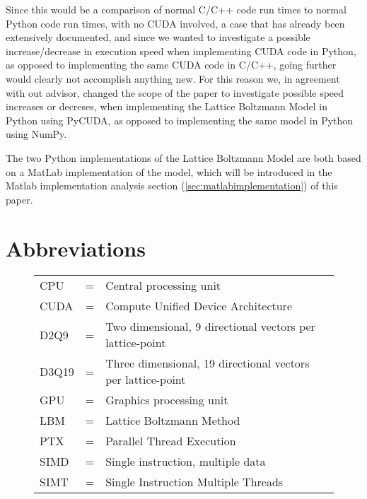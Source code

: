 Since this would be a comparison of normal C/C++ code run times to normal Python code run times, with no CUDA involved, a case that has already been extensively documented, and since we wanted to investigate a possible increase/decrease in execution speed when implementing CUDA code in Python, as opposed to implementing the same CUDA code in C/C++, going further would clearly not accomplish anything new. For this reason we, in agreement with out advisor, changed the scope of the paper to investigate possible speed increases or decreses, when implementing the Lattice Boltzmann Model in Python using PyCUDA, as opposed to implementing the same model in Python using NumPy.

The two Python implementations of the Lattice Boltzmann Model are both based on a MatLab implementation of the model, which will be introduced in the Matlab implementation analysis section (\autoref{sec:matlabimplementation}) of this paper.

\newpage

\section{Abbreviations}

\begin{figure}[htb]
\centering
	\begin{tabular}{lcl}
	    CPU & = & Central processing unit\\
	    CUDA & = & Compute Unified Device Architecture\\
		D2Q9 & = & Two dimensional, 9 directional vectors per lattice-point\\
		D3Q19 & = & Three dimensional, 19 directional vectors per lattice-point\\
		GPU & = & Graphics processing unit\\
		LBM & = & Lattice Boltzmann Method\\
		PTX & = & Parallel Thread Execution\\
		SIMD & = & Single instruction, multiple data\\
		SIMT & = & Single Instruction Multiple Threads
	\end{tabular}
\end{figure}

\newpage


\newpage


\newpage


\newpage



